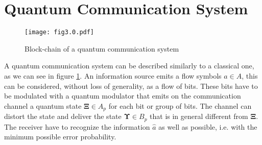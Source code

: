 \section{Quantum Communication System}
    \begin{figure}[tbp]
        \begin{center}
            \texttt{[image: fig3.0.pdf]}
            \caption{Block-chain of a quantum communication system}
            \label{fig:3.0}
        \end{center}
    \end{figure}
    A quantum communication system can be described similarly to a classical one, as we can 
    see in figure \ref{fig:3.0}. An information source emits a flow symbols $a \in A$, this
    can be considered, without loss of generality, as a flow of bits. These bits have to be 
    modulated with a quantum modulator that emits on the communication channel a quantum state
    $\pmb{\Xi} \in A_p$ for each bit or group of bits. The channel can distort the state and deliver
    the state $\pmb{\Upsilon} \in B_p$ that is in general different from $\pmb{\Xi}$.
    The receiver have to recognize the information $\hat{a}$ as well as possible, i.e. with 
    the minimum possible error probability.
